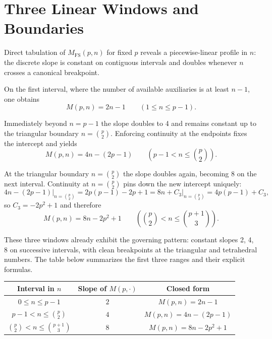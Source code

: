 \documentclass[11pt]{article}
\theoremstyle{definition}
\begin{document}
\section{Three Linear Windows and Boundaries}

Direct tabulation of $M_{\mathrm{FS}}(p,n)$ for fixed $p$ reveals a piecewise-linear profile in $n$: the discrete slope is constant on contiguous intervals and doubles whenever $n$ crosses a canonical breakpoint.

On the first interval, where the number of available auxiliaries is at least $n-1$, one obtains
\begin{equation}\label{eq:window0}
M(p,n) = 2n - 1 \qquad (1 \leq n \leq p-1).
\end{equation}

Immediately beyond $n = p-1$ the slope doubles to 4 and remains constant up to the triangular boundary $n = \binom{p}{2}$. Enforcing continuity at the endpoints fixes the intercept and yields
\begin{equation}\label{eq:window1}
M(p,n) = 4n - (2p-1) \qquad (p-1 < n \leq \binom{p}{2}).
\end{equation}

At the triangular boundary $n = \binom{p}{2}$ the slope doubles again, becoming 8 on the next interval. Continuity at $n = \binom{p}{2}$ pins down the new intercept uniquely:
\[
4n-(2p-1)\Big|_{n=\binom{p}{2}} = 2p(p-1) - 2p + 1 = 8n + C_3\Big|_{n=\binom{p}{2}} = 4p(p-1) + C_3,
\]
so $C_3 = -2p^2 + 1$ and therefore
\begin{equation}\label{eq:window2}
M(p,n) = 8n - 2p^2 + 1 \qquad (\binom{p}{2} < n \leq \binom{p+1}{3}).
\end{equation}

These three windows already exhibit the governing pattern: constant slopes 2, 4, 8 on successive intervals, with clean breakpoints at the triangular and tetrahedral numbers. The table below summarizes the first three ranges and their explicit formulas.

\begin{center}
\renewcommand{\arraystretch}{1.2}
\begin{tabular}{c|c|c}
\textbf{Interval in $n$} & \textbf{Slope of $M(p,\cdot)$} & \textbf{Closed form} \\
\hline
$0 \leq n \leq p-1$ & $2$ & $M(p,n) = 2n - 1$ \\
$p-1 < n \leq \binom{p}{2}$ & $4$ & $M(p,n) = 4n - (2p-1)$ \\
$\binom{p}{2} < n \leq \binom{p+1}{3}$ & $8$ & $M(p,n) = 8n - 2p^2 + 1$
\end{tabular}
\end{center}
\end{document}
